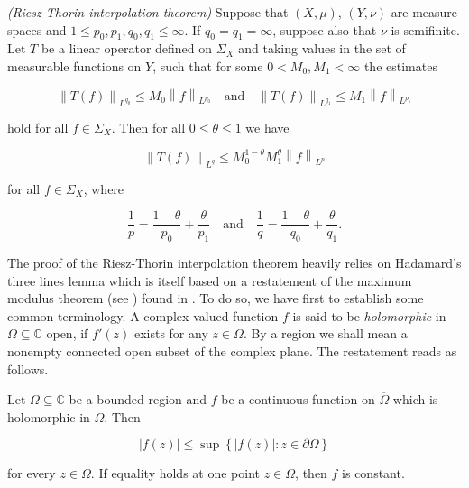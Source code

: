 \begin{mdframed}
	\begin{theorem}\emph{(Riesz-Thorin interpolation theorem)}
		Suppose that $(X,\mu)$, $(Y,\nu)$ are measure spaces and $1 \leq p_0,p_1,q_0,q_1 \leq \infty$. If $q_0 = q_1 = \infty$, suppose also that $\nu$ is semifinite. Let $T$ be a linear operator defined on $\Sigma_X$ and taking values in the set of measurable functions on $Y$, such that for some $0 < M_0,M_1 < \infty$ the estimates 

		\begin{equation}
			\left\|T(f)\right\|_{L^{q_0}} \leq M_0\left\|f\right\|_{L^{p_0}} \quad \text{and} \quad \left\|T(f)\right\|_{L^{q_1}} \leq M_1\left\|f\right\|_{L^{p_1}}
			\label{hyp:Lq0Lq1}
		\end{equation}

		\noindent hold for all $f \in \Sigma_X$. Then for all $0 \leq \theta \leq 1$ we have

		\begin{equation}
			\left\|T(f)\right\|_{L^q} \leq M_0^{1 - \theta}M_1^\theta\left\|f\right\|_{L^p}
			\label{est:boundTf}
		\end{equation}

		\noindent for all $f \in \Sigma_X$, where

		\begin{equation*}
			\frac{1}{p} = \frac{1 - \theta}{p_0} + \frac{\theta}{p_1} \quad \text{and} \quad \frac{1}{q} = \frac{1 - \theta}{q_0} + \frac{\theta}{q_1}.
		\end{equation*}
		\label{thm:Riesz_Thorin}
	\end{theorem}
\end{mdframed}

\vspace{2mm}

The proof of the Riesz-Thorin interpolation theorem heavily relies on Hadamard's three lines lemma which is itself based on a restatement of the maximum modulus theorem (see \cite[212]{rudin:rc_analysis:1987}) found in \cite[253]{rudin:rc_analysis:1987}. To do so, we have first to establish some common terminology. A complex-valued function $f$ is said to be \emph{holomorphic} in $\Omega \subseteq \mathbb{C}$ open, if $f'(z)$ exists for any $z \in \Omega$. By a region we shall mean a nonempty connected open subset of the complex plane. The restatement reads as follows.

\begin{theorem*}
	Let $\Omega \subseteq \mathbb{C}$ be a bounded region and $f$ be a continuous function on $\overline{\Omega}$ which is holomorphic in $\Omega$. Then 

	\begin{equation*}
		\left| f(z)\right| \leq \sup\left\{ \left|f(z) \right| : z \in \partial\Omega\right\}
	\end{equation*}

	\noindent for every $z \in \Omega$. If equality holds at one point $z \in \Omega$, then $f$ is constant.
\end{theorem*}


